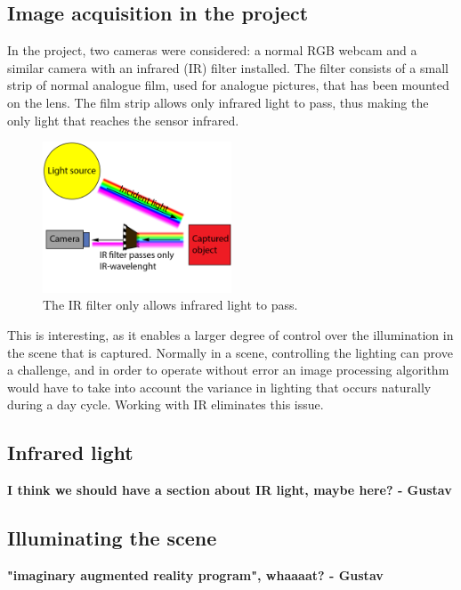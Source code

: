 \subsection{Image acquisition in the project}
In the project, two cameras were considered: a normal RGB webcam and a similar camera with an infrared (IR) filter installed. The filter consists of a small strip of normal analogue film, used for analogue pictures, that has been mounted on the lens. The film strip allows only infrared light to pass, thus making the only light that reaches the sensor infrared.

\begin{figure}[htbp] 
\centering 
\includegraphics[width=0.5\textwidth]{Pictures/Theory/IR_filter.png} 
\caption{The IR filter only allows infrared light to pass.} 
\label{fig:ir_filter} 
\end{figure}

This is interesting, as it enables a larger degree of control over the illumination in the scene that is captured. Normally in a scene, controlling the lighting   can prove a challenge, and in order to operate without error an image processing algorithm would have to take into account the variance in lighting that occurs naturally during a day cycle. Working with IR eliminates this issue.

\subsection{Infrared light}
\textbf{I think we should have a section about IR light, maybe here? - Gustav}

\subsection{Illuminating the scene}
\textbf{"imaginary augmented reality program", whaaaat? - Gustav}


